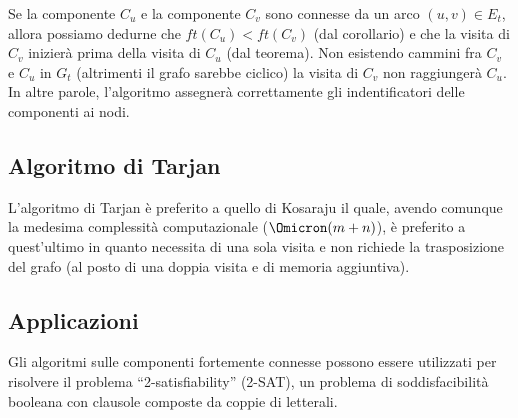 Se la componente \(C_u\) e la componente \(C_v\) sono connesse da un arco \((u,v) \in E_t\), allora possiamo dedurne che \(ft(C_u) < ft(C_v)\) (dal corollario) e che la visita di \(C_v\) inizierà prima della visita di \(C_u\) (dal teorema).
Non esistendo cammini fra \(C_v\) e \(C_u\) in \(G_t\) (altrimenti il grafo sarebbe ciclico) la visita di \(C_v\) non raggiungerà \(C_u\).
In altre parole, l'algoritmo \ConnectedComponents assegnerà correttamente gli indentificatori delle componenti ai nodi.

\subsection*{Algoritmo di Tarjan}

L'algoritmo di Tarjan è preferito a quello di Kosaraju il quale, avendo comunque la medesima complessità computazionale (\(\Omicron(m+n)\)), è preferito a quest'ultimo in quanto necessita di una sola visita e non richiede la trasposizione del grafo (al posto di una doppia visita e di memoria aggiuntiva).

\subsection*{Applicazioni}

Gli algoritmi sulle componenti fortemente connesse possono essere utilizzati per risolvere il problema \enquote{2-satisfiability} (2-SAT), un problema di soddisfacibilità booleana con clausole composte da coppie di letterali.

\ifsubfile

\fi
